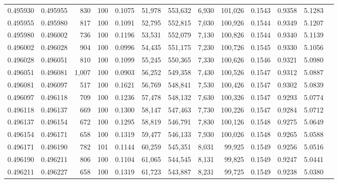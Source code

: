 \begin{tabular}{rrrrrrrrrrrrr}
0.495930 & 0.495955 &   830 & 100 &                                     0.1075 &  51,978 & 553,632 &   6,930 & 101,026 & 0.1543 & 0.9358 & 5.1283 \\
0.495955 & 0.495980 &   817 & 100 &                                     0.1091 &  52,795 & 552,815 &   7,030 & 100,926 & 0.1544 & 0.9349 & 5.1207 \\
0.495980 & 0.496002 &   736 & 100 &                                     0.1196 &  53,531 & 552,079 &   7,130 & 100,826 & 0.1544 & 0.9340 & 5.1139 \\
0.496002 & 0.496028 &   904 & 100 &                                     0.0996 &  54,435 & 551,175 &   7,230 & 100,726 & 0.1545 & 0.9330 & 5.1056 \\
0.496028 & 0.496051 &   810 & 100 &                                     0.1099 &  55,245 & 550,365 &   7,330 & 100,626 & 0.1546 & 0.9321 & 5.0980 \\
0.496051 & 0.496081 & 1,007 & 100 &                                     0.0903 &  56,252 & 549,358 &   7,430 & 100,526 & 0.1547 & 0.9312 & 5.0887 \\
0.496081 & 0.496097 &   517 & 100 &                                     0.1621 &  56,769 & 548,841 &   7,530 & 100,426 & 0.1547 & 0.9302 & 5.0839 \\
0.496097 & 0.496118 &   709 & 100 &                                     0.1236 &  57,478 & 548,132 &   7,630 & 100,326 & 0.1547 & 0.9293 & 5.0774 \\
0.496118 & 0.496137 &   669 & 100 &                                     0.1300 &  58,147 & 547,463 &   7,730 & 100,226 & 0.1547 & 0.9284 & 5.0712 \\
0.496137 & 0.496154 &   672 & 100 &                                     0.1295 &  58,819 & 546,791 &   7,830 & 100,126 & 0.1548 & 0.9275 & 5.0649 \\
0.496154 & 0.496171 &   658 & 100 &                                     0.1319 &  59,477 & 546,133 &   7,930 & 100,026 & 0.1548 & 0.9265 & 5.0588 \\
0.496171 & 0.496190 &   782 & 101 &                                     0.1144 &  60,259 & 545,351 &   8,031 &  99,925 & 0.1549 & 0.9256 & 5.0516 \\
0.496190 & 0.496211 &   806 & 100 &                                     0.1104 &  61,065 & 544,545 &   8,131 &  99,825 & 0.1549 & 0.9247 & 5.0441 \\
0.496211 & 0.496227 &   658 & 100 &                                     0.1319 &  61,723 & 543,887 &   8,231 &  99,725 & 0.1549 & 0.9238 & 5.0380 \\

\end{tabular}
